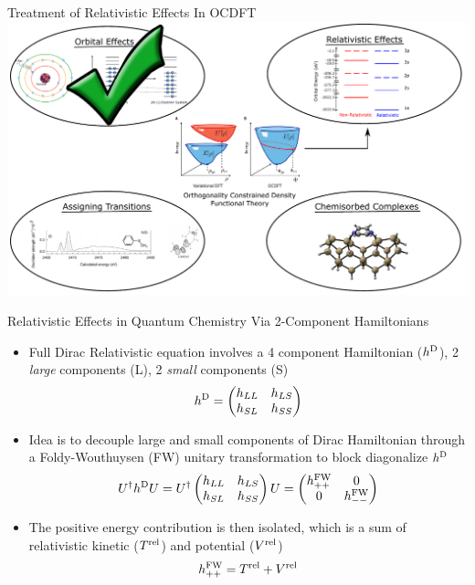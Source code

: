 \documentclass[t]{beamer}
\begin{document}
\begin{frame}{Treatment of Relativistic Effects In OCDFT}
\centering
\includegraphics[width=\linewidth]{project_intro_2.pdf}
\end{frame}

\begin{frame}{Relativistic Effects in Quantum Chemistry Via 2-Component Hamiltonians}
\begin{itemize}
\item Full Dirac Relativistic equation involves a 4 component Hamiltonian ($h^{\rm D}$), 2 \textit{large} components (L), 2 \textit{small} components (S)
\begin{equation}
h^{\rm D} = 
\begin{pmatrix}
h_{LL} & h_{LS} \\
h_{SL} & h_{SS}
\end{pmatrix}
\end{equation}
\item Idea is to decouple large and small components of Dirac Hamiltonian through a Foldy-Wouthuysen (FW) unitary transformation to block diagonalize $h^{\rm D}$
\begin{equation}
U^\dagger h^{\rm D} U = 
U^\dagger
\begin{pmatrix}
h_{LL} & h_{LS} \\
h_{SL} & h_{SS}
\end{pmatrix}
 U
 =
 \begin{pmatrix}
h^{\rm FW}_{++} & 0 \\
0 & h^{\rm FW}_{--}
\end{pmatrix}
\end{equation}
\item The positive energy contribution is then isolated, which is a sum of relativistic kinetic ($T^{\rm rel}$) and potential ($V^{\rm rel}$)
\begin{equation}
h^{\rm FW}_{++} = T^{\rm rel} + V^{\rm rel}
\end{equation}
\end{itemize}
\end{frame}
\end{document}
